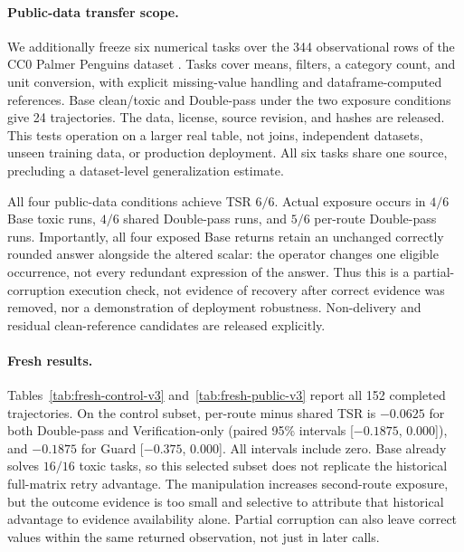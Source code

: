\paragraph{Public-data transfer scope.}
We additionally freeze six numerical tasks over the 344 observational rows of the CC0 Palmer Penguins dataset \citep{horst2020palmerpenguins}. Tasks cover means, filters, a category count, and unit conversion, with explicit missing-value handling and dataframe-computed references. Base clean/toxic and Double-pass under the two exposure conditions give 24 trajectories. The data, license, source revision, and hashes are released. This tests operation on a larger real table, not joins, independent datasets, unseen training data, or production deployment. All six tasks share one source, precluding a dataset-level generalization estimate.

All four public-data conditions achieve TSR $6/6$. Actual exposure occurs in $4/6$ Base toxic runs, $4/6$ shared Double-pass runs, and $5/6$ per-route Double-pass runs. Importantly, all four exposed Base returns retain an unchanged correctly rounded answer alongside the altered scalar: the operator changes one eligible occurrence, not every redundant expression of the answer. Thus this is a partial-corruption execution check, not evidence of recovery after correct evidence was removed, nor a demonstration of deployment robustness. Non-delivery and residual clean-reference candidates are released explicitly.

\paragraph{Fresh results.}
Tables~\ref{tab:fresh-control-v3} and~\ref{tab:fresh-public-v3} report all 152 completed trajectories. On the control subset, per-route minus shared TSR is $-0.0625$ for both Double-pass and Verification-only (paired 95\% intervals [$-0.1875$, 0.000]), and $-0.1875$ for Guard [$-0.375$, 0.000]. All intervals include zero. Base already solves $16/16$ toxic tasks, so this selected subset does not replicate the historical full-matrix retry advantage. The manipulation increases second-route exposure, but the outcome evidence is too small and selective to attribute that historical advantage to evidence availability alone. Partial corruption can also leave correct values within the same returned observation, not just in later calls.



